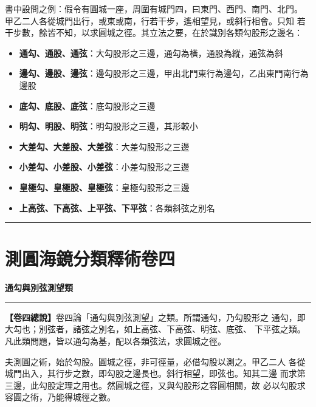 \documentclass[11pt,a4paper]{article}
\newcommand{\longline}{\noindent\rule{\textwidth}{0.4pt}}
\newcounter{probnum}
\begin{document}
書中設問之例：假令有圓城一座，周圍有城門四，曰東門、西門、南門、北門。
甲乙二人各從城門出行，或東或南，行若干步，遙相望見，或斜行相會。只知
若干步數，餘皆不知，以求圓城之徑。其立法之要，在於識別各類勾股形之邊名：
\begin{itemize}
  \item \textbf{通勾、通股、通弦}：大勾股形之三邊，通勾為橫，通股為縱，通弦為斜
  \item \textbf{邊勾、邊股、邊弦}：邊勾股形之三邊，甲出北門東行為邊勾，乙出東門南行為邊股
  \item \textbf{底勾、底股、底弦}：底勾股形之三邊
  \item \textbf{明勾、明股、明弦}：明勾股形之三邊，其形較小
  \item \textbf{大差勾、大差股、大差弦}：大差勾股形之三邊
  \item \textbf{小差勾、小差股、小差弦}：小差勾股形之三邊
  \item \textbf{皇極勾、皇極股、皇極弦}：皇極勾股形之三邊
  \item \textbf{上高弦、下高弦、上平弦、下平弦}：各類斜弦之別名
\end{itemize}

\vspace{0.5cm}
\longline

\newpage

\setcounter{probnum}{0}

\section{測圓海鏡分類釋術卷四}
\label{sec:vol4}

\begin{center}
{\Large\bfseries\color{volcolor} 通勾與別弦測望類}
\end{center}

\vspace{0.3cm}
\longline
\vspace{0.3cm}

\noindent
\textbf{【卷四總說】}卷四論「通勾與別弦測望」之類。所謂通勾，乃勾股形之
通勾，即大勾也；別弦者，諸弦之別名，如上高弦、下高弦、明弦、底弦、
下平弦之類。凡此類問題，皆以通勾為基，配以各類弦法，求圓城之徑。

夫測圓之術，始於勾股。圓城之徑，非可徑量，必借勾股以測之。甲乙二人
各從城門出入，其行步之數，即勾股之邊長也。斜行相望，即弦也。知其二邊
而求第三邊，此勾股定理之用也。然圓城之徑，又與勾股形之容圓相關，故
必以勾股求容圓之術，乃能得城徑之數。
\end{document}

